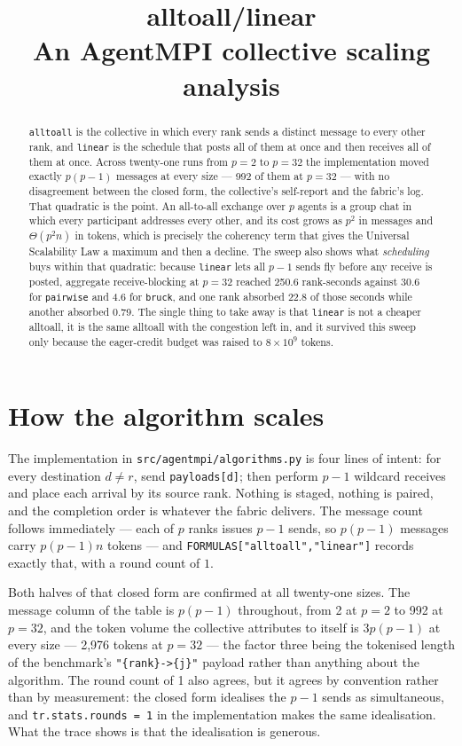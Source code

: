\documentclass[11pt]{article}
\title{\textbf{alltoall/linear}\\[2pt]\large An AgentMPI collective scaling analysis}
\author{}
\date{}
\begin{document}
\maketitle

\begin{abstract}
\texttt{alltoall} is the collective in which every rank sends a distinct message to every
other rank, and \texttt{linear} is the schedule that posts all of them at once and then
receives all of them at once. Across twenty-one runs from $p=2$ to $p=32$ the implementation
moved exactly $p(p-1)$ messages at every size --- 992 of them at $p=32$ --- with no
disagreement between the closed form, the collective's self-report and the fabric's log.
That quadratic is the point. An all-to-all exchange over $p$ agents is a group chat in which
every participant addresses every other, and its cost grows as $p^2$ in messages and
$\Theta(p^2 n)$ in tokens, which is precisely the coherency term that gives the Universal
Scalability Law a maximum and then a decline. The sweep also shows what \emph{scheduling}
buys within that quadratic: because \texttt{linear} lets all $p-1$ sends fly before any
receive is posted, aggregate receive-blocking at $p=32$ reached 250.6 rank-seconds against
30.6 for \texttt{pairwise} and 4.6 for \texttt{bruck}, and one rank absorbed 22.8 of those
seconds while another absorbed 0.79. The single thing to take away is that \texttt{linear}
is not a cheaper alltoall, it is the same alltoall with the congestion left in, and it
survived this sweep only because the eager-credit budget was raised to $8\times10^9$ tokens.
\end{abstract}



\section{How the algorithm scales}

The implementation in \texttt{src/agentmpi/algorithms.py} is four lines of intent: for every
destination $d \neq r$, send \texttt{payloads[d]}; then perform $p-1$ wildcard receives and
place each arrival by its source rank. Nothing is staged, nothing is paired, and the
completion order is whatever the fabric delivers. The message count follows immediately ---
each of $p$ ranks issues $p-1$ sends, so $p(p-1)$ messages carry $p(p-1)n$ tokens --- and
\texttt{FORMULAS["alltoall","linear"]} records exactly that, with a round count of $1$.

Both halves of that closed form are confirmed at all twenty-one sizes. The message column of
the table is $p(p-1)$ throughout, from 2 at $p=2$ to 992 at $p=32$, and the token volume the
collective attributes to itself is $3p(p-1)$ at every size --- 2,976 tokens at $p=32$ --- the
factor three being the tokenised length of the benchmark's \verb|"{rank}->{j}"| payload
rather than anything about the algorithm. The round count of 1 also agrees, but it agrees by
convention rather than by measurement: the closed form idealises the $p-1$ sends as
simultaneous, and \texttt{tr.stats.rounds = 1} in the implementation makes the same
idealisation. What the trace shows is that the idealisation is generous.
\end{document}
